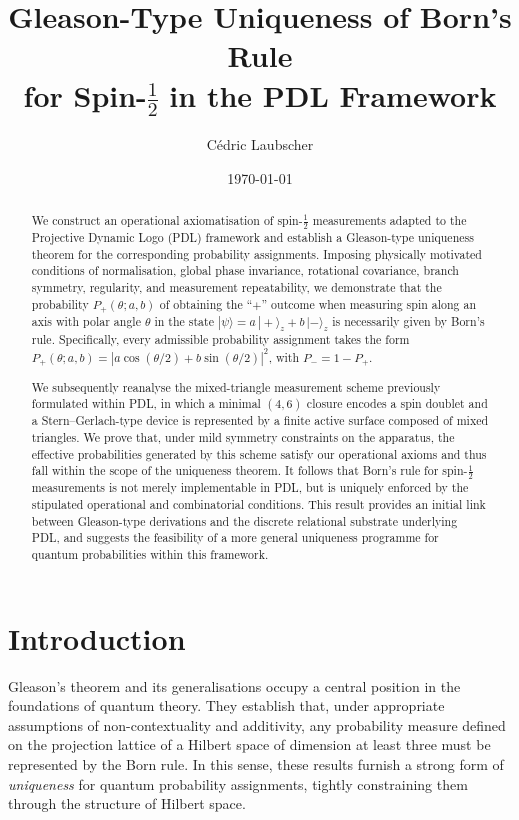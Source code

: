 \documentclass[11pt,a4paper]{article}
\title{%
Gleason-Type Uniqueness of Born's Rule\\
for Spin-$\tfrac{1}{2}$ in the PDL Framework
}
\author{C\'edric Laubscher}
\date{\today}
\numberwithin{equation}{section}
\theoremstyle{definition}
\begin{document}

\maketitle

\begin{abstract}
We construct an operational axiomatisation of spin-$\tfrac12$ measurements adapted to the Projective Dynamic Logo (PDL) framework and establish a Gleason-type uniqueness theorem for the corresponding probability assignments. Imposing physically motivated conditions of normalisation, global phase invariance, rotational covariance, branch symmetry, regularity, and measurement repeatability, we demonstrate that the probability $P_+(\theta;a,b)$ of obtaining the ``$+$'' outcome when measuring spin along an axis with polar angle $\theta$ in the state $|\psi\rangle = a\,|+\rangle_z + b\,|-\rangle_z$ is necessarily given by Born’s rule. Specifically, every admissible probability assignment takes the form $P_+(\theta;a,b)=|a\cos(\theta/2)+b\sin(\theta/2)|^2$, with $P_-=1-P_+$.

We subsequently reanalyse the mixed-triangle measurement scheme previously formulated within PDL, in which a minimal $(4,6)$ closure encodes a spin doublet and a Stern–Gerlach-type device is represented by a finite active surface composed of mixed triangles. We prove that, under mild symmetry constraints on the apparatus, the effective probabilities generated by this scheme satisfy our operational axioms and thus fall within the scope of the uniqueness theorem. It follows that Born’s rule for spin-$\tfrac12$ measurements is not merely implementable in PDL, but is uniquely enforced by the stipulated operational and combinatorial conditions. This result provides an initial link between Gleason-type derivations and the discrete relational substrate underlying PDL, and suggests the feasibility of a more general uniqueness programme for quantum probabilities within this framework.
\end{abstract}

\section{Introduction}
\label{sec:introduction}

Gleason's theorem and its generalisations occupy a central position in the foundations of quantum theory. They establish that, under appropriate assumptions of non-contextuality and additivity, any probability measure defined on the projection lattice of a Hilbert space of dimension at least three must be represented by the Born rule.\cite{Gleason1957,BuschEtAlBook} In this sense, these results furnish a strong form of \emph{uniqueness} for quantum probability assignments, tightly constraining them through the structure of Hilbert space.
\end{document}

